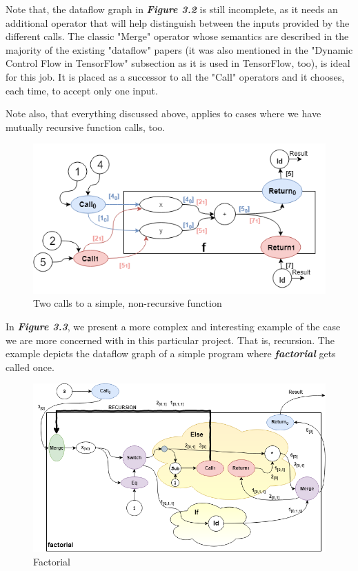 \documentclass[ack,preface]{dithesis}
\begin{document}
Note that, the dataflow graph in \textit{\textbf{Figure 3.2}} is still incomplete, as it needs an additional operator that will help distinguish between the inputs provided by the different calls. The classic "Merge" operator whose semantics are described in the majority of  the existing "dataflow" papers (it was also mentioned in the "Dynamic Control Flow in TensorFlow" subsection as it is used in TensorFlow, too), is ideal for this job. It is placed as a successor to all the "Call" operators and it chooses, each time, to accept only one input.

Note also, that everything discussed above, applies to cases where we have mutually recursive function calls, too. 

\begin{figure}
\centering
\includegraphics[scale=0.7]{figures/Example2}
\caption{Two calls to a simple, non-recursive function}
\end{figure}

In  \textit{\textbf{Figure 3.3}}, we present a more complex and interesting example of the case we are more concerned with in this particular project. That is, recursion. The example depicts the dataflow graph of a simple program where  \textit{\textbf{factorial}} gets called once.

\begin{figure}
\centering
\includegraphics[scale=0.65]{figures/factorial}
\caption{Factorial}
\end{figure}
\end{document}
